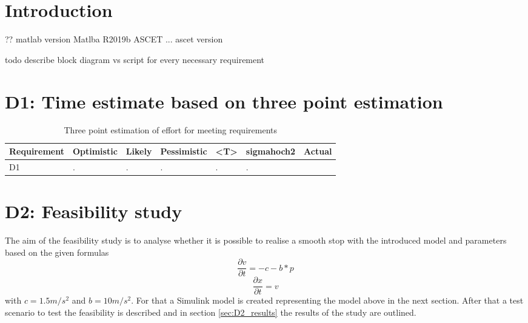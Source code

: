 
\chapter{Introduction}\label{cha:Introduction}
??
matlab version Matlba R2019b
ASCET ...
ascet version

todo describe block diagram vs script for every necessary requirement
\chapter{D1: Time estimate based on three point estimation}\label{cha:D1}
\begin{table}[H]
\centering
\caption{Three point estimation of effort for meeting requirements}
\begin{adjustbox}{width=1\textwidth, center=\textwidth}
\renewcommand{\arraystretch}{1}
\begin{tabular}{lllllll}
\textbf{Requirement} & \textbf{Optimistic} & \textbf{Likely} & \textbf{Pessimistic} & \textbf{<T>} & \textbf{sigmahoch2} & \textbf{Actual}\\\hline
D1 & .& .& .& .& .&\\
\end{tabular}
\end{adjustbox}
\label{tbl:ConceptTPTPProductionSymbols}
\end{table}
\chapter{D2: Feasibility study}\label{cha:D2}
The aim of the feasibility study is to analyse whether it is possible to realise a smooth stop with the introduced model and parameters based on the given formulas
\begin{equation}
	\frac{\partial v}{\partial t} = -c-b*p
\end{equation}
\begin{equation}
	\frac{\partial x}{\partial t} = v
\end{equation}
with $c = 1.5 m/s^2$ and $b = 10 m/s^2$.
For that a Simulink model is created representing the model above in the next section.
After that a test scenario to test the feasibility is described and in section \ref{sec:D2_results} the results of the study are outlined.

